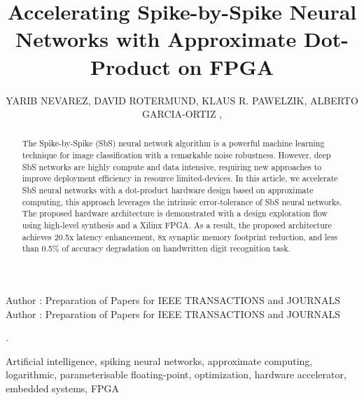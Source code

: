 \title {Accelerating Spike-by-Spike Neural Networks with Approximate Dot-Product on FPGA}

\author{
	\uppercase{Yarib Nevarez},	
	\uppercase{David Rotermund},
	\uppercase{Klaus R. Pawelzik},
	\uppercase{Alberto Garcia-Ortiz} ,
}

\address[1]{Institute of Electrodynamics and Microelectronics, University of Bremen, Bremen 28359, Germany (e-mail: nevarez@item.uni-bremen.de)}

\address[2]{Institute for Theoretical Physics, University of Bremen, Bremen 28359, Germany (e-mail: davrot@@neuro.uni-bremen.de)}

\address[3]{Institute for Theoretical Physics, University of Bremen, Bremen 28359, Germany (e-mail: pawelzik@@neuro.uni-bremen.de)}

\address[4]{Institute of Electrodynamics and Microelectronics, University of Bremen, Bremen 28359, Germany (e-mail: agaracia@item.uni-bremen.de)}


\markboth
{Author \headeretal: Preparation of Papers for IEEE TRANSACTIONS and JOURNALS}
{Author \headeretal: Preparation of Papers for IEEE TRANSACTIONS and JOURNALS}

.

\begin{abstract}
The Spike-by-Spike (SbS) neural network algorithm is a powerful machine learning technique for image classification with a remarkable noise robustness. However, deep SbS networks are highly compute and data intensive, requiring new approaches to improve deployment efficiency in resource limited-devices. In this article, we accelerate SbS neural networks with a dot-product hardware design based on approximate computing, this approach leverages the intrinsic error-tolerance of SbS neural networks. The proposed hardware architecture is demonstrated with a design exploration flow using high-level synthesis and a Xilinx FPGA. As a result, the proposed architecture achieves 20.5x latency enhancement, 8x synaptic memory footprint reduction, and less than 0.5\% of accuracy degradation on handwritten digit recognition task.
	
\end{abstract}

\begin{keywords}
Artificial intelligence, spiking neural networks, approximate computing, logarithmic, parameterisable floating-point, optimization, hardware accelerator, embedded systems, FPGA
\end{keywords}

\titlepgskip=-15pt

\maketitle
